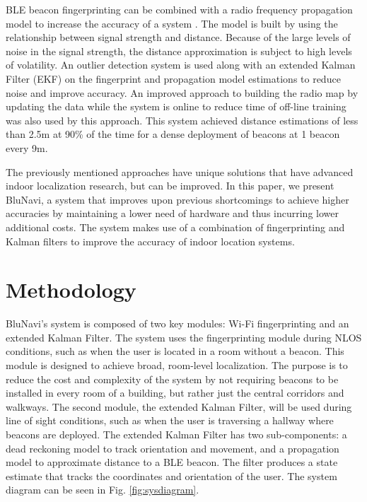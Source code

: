 \documentclass[conference]{IEEEtran}
\begin{document}
BLE beacon fingerprinting can be combined with a radio frequency propagation model to increase the accuracy of a system \cite{zhuang2016smartphone}. The model is built by using the relationship between signal strength and distance. Because of the large levels of noise in the signal strength, the distance approximation is subject to high levels of volatility.  An outlier detection system is used along with an extended Kalman Filter (EKF) on the fingerprint and propagation model estimations to reduce noise and improve accuracy. An improved approach to building the radio map by updating the data while the system is online to reduce time of off-line training was also used by this approach. This system achieved distance estimations of less than 2.5m at 90\% of the time for a dense deployment of beacons at 1 beacon every 9m.

The previously mentioned approaches have unique solutions that have advanced indoor localization research, but can be improved. In this paper, we present BluNavi, a system that improves upon previous shortcomings to achieve higher accuracies by maintaining a lower need of hardware and thus incurring lower additional costs. The system makes use of a combination of fingerprinting and Kalman filters to improve the accuracy of indoor location systems.

\section{Methodology}

BluNavi's system is composed of two key modules: Wi-Fi fingerprinting and an extended Kalman Filter. The system uses the fingerprinting module during NLOS conditions, such as when the user is located in a room without a beacon. This module is designed to achieve broad, room-level localization. The purpose is to reduce the cost and complexity of the system by not requiring beacons to be installed in every room of a building, but rather just the central corridors and walkways. The second module, the extended Kalman Filter, will be used during line of sight conditions, such as when the user is traversing a hallway where beacons are deployed. The extended Kalman Filter has two sub-components: a dead reckoning model to track orientation and movement, and a propagation model to approximate distance to a BLE beacon. The filter produces a state estimate that tracks the coordinates and orientation of the user. The system diagram can be seen in Fig. \ref{fig:sysdiagram}.
\end{document}

